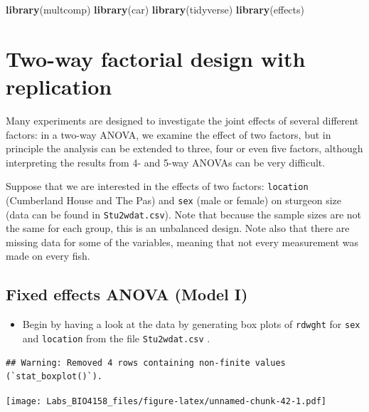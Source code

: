 \documentclass[
  12pt,
]{book}
\newenvironment{Shaded}{\begin{snugshade}}{\end{snugshade}}
\newcommand{\KeywordTok}[1]{\textcolor[rgb]{0.13,0.29,0.53}{\textbf{#1}}}
\newcommand{\NormalTok}[1]{#1}
\providecommand{\tightlist}{%
  \setlength{\itemsep}{0pt}\setlength{\parskip}{0pt}}
\begin{document}
\begin{Shaded}
\begin{Highlighting}[]
\KeywordTok{library}\NormalTok{(multcomp)}
\KeywordTok{library}\NormalTok{(car)}
\KeywordTok{library}\NormalTok{(tidyverse)}
\KeywordTok{library}\NormalTok{(effects)}
\end{Highlighting}
\end{Shaded}

\hypertarget{two-way-factorial-design-with-replication}{%
\section{Two-way factorial design with replication}\label{two-way-factorial-design-with-replication}}

Many experiments are designed to investigate the joint effects of several different factors: in a two-way ANOVA, we examine the effect of two factors, but in principle the analysis can be extended to three, four or even five factors, although interpreting the results from 4- and 5-way ANOVAs can be very difficult.

Suppose that we are interested in the effects of two factors: \texttt{location} (Cumberland House and The Pas) and \texttt{sex} (male or female) on sturgeon size (data can be found in \texttt{Stu2wdat.csv}). Note that because the sample sizes are not the same for each group, this is an unbalanced design. Note also that there are missing data for some of the variables, meaning that not every measurement was made on every fish.

\hypertarget{fixed-effects-anova-model-i}{%
\subsection{Fixed effects ANOVA (Model I)}\label{fixed-effects-anova-model-i}}

\begin{itemize}
\tightlist
\item
  Begin by having a look at the data by generating box plots of \texttt{rdwght} for \texttt{sex} and \texttt{location} from the file \texttt{Stu2wdat.csv} .
\end{itemize}

\begin{verbatim}
## Warning: Removed 4 rows containing non-finite values (`stat_boxplot()`).
\end{verbatim}

\texttt{[image: Labs\_BIO4158\_files/figure-latex/unnamed-chunk-42-1.pdf]}
\end{document}
